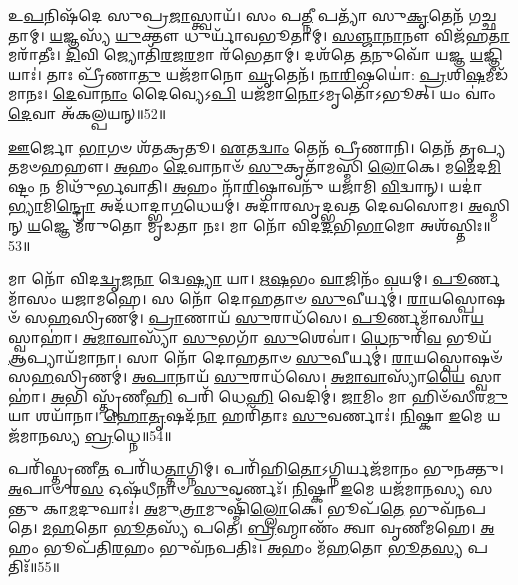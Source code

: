 𑌉\-\ul{𑌪}\-𑌨𑌿𑌷᳴𑌦𑍇 𑌸𑍁𑌪𑍍𑌰\-\ul{𑌜𑌾}\-𑌸𑍍𑌤𑍍𑌵𑌾𑌯᳴।
𑌸𑌂 𑌪\-\ul{𑌤𑍍𑌨𑍀} 𑌪𑌤𑍍𑌯𑌾᳴ 𑌸𑍁\-\ul{𑌕𑍃}\-𑌤𑍇𑌨᳴ 𑌗𑌚𑍍𑌛𑌤𑌾𑌮𑍍।
\-\ul{𑌯}\-𑌜𑍍𑌞𑌸𑍍𑌯᳴ \ul{𑌯𑍁}\-𑌕𑍍𑌤𑍗 𑌧𑍁𑌰𑍍𑌯𑌾᳴𑌵𑌭𑍂𑌤𑌾𑌮𑍍।
\-\ul{𑌸}\-\-\ul{𑌞𑍍𑌜𑌾}\-\-\ul{𑌨𑌾}\-𑌨𑍗 𑌵𑌿𑌜᳴𑌹\-\ul{𑌤𑌾}\-𑌮𑌰𑌾᳴𑌤𑍀𑌃।
\-\ul{𑌦𑌿}\-𑌵𑌿 𑌜𑍍𑌯𑍋𑌤𑌿᳴\-\ul{𑌰}\-𑌜\-\ul{𑌰}\-𑌮𑌾 𑌰᳴𑌭𑍇𑌤𑌾𑌮𑍍।
𑌦𑌶᳴𑌤𑍇 \ul{𑌤}\-𑌨𑍁𑌵𑍋᳴ 𑌯𑌜𑍍𑌞 \ul{𑌯}\-𑌜𑍍𑌞𑌿𑌯𑌾𑌃॑।
𑌤𑌾𑌃 𑌪𑍍𑌰𑍀᳴𑌣𑌾\-\ul{𑌤𑍁} 𑌯𑌜᳴𑌮𑌾𑌨𑍋 \ul{𑌘𑍃}\-𑌤𑍇𑌨᳴।
\-\ul{𑌨𑌾}\-\-\ul{𑌰𑌿}\-𑌷𑍍𑌠𑌯𑍋॑: \ul{𑌪𑍍𑌰}\-𑌶𑌿\-\ul{𑌷}\-𑌮𑍀𑌡᳴𑌮𑌾𑌨𑌃।
\-\ul{𑌦𑍇}\-𑌵𑌾\-\ul{𑌨𑌾𑌂} 𑌦𑍈𑌵𑍍𑌯𑍇𑌽\-\ul{𑌪𑌿} 𑌯𑌜᳴𑌮𑌾\-\ul{𑌨𑍋}\-\-𑌽𑌮𑍃𑌤𑍋᳴\-𑌽𑌭𑍂𑌤𑍍।
𑌯𑌂 𑌵𑌾𑌂॑ \ul{𑌦𑍇}\-𑌵𑌾 𑌅᳴𑌕𑌲𑍍𑌪𑌯𑌨𑍍॥52॥

\-\ul{𑌊}\-𑌰𑍍𑌜𑍋 \ul{𑌭𑌾}\-𑌗𑍞 𑌶᳴𑌤𑌕𑍍𑌰𑌤𑍂।
\-\ul{𑌏}\-𑌤\-\ul{𑌦𑍍𑌵𑌾𑌂} 𑌤𑍇𑌨᳴ 𑌪𑍍𑌰𑍀𑌣𑌾𑌨𑌿।
𑌤𑍇𑌨᳴ 𑌤𑍃𑌪𑍍𑌯𑌤𑌮𑍞𑌹𑌹𑍗।
\-\ul{𑌅}\-𑌹𑌂 \ul{𑌦𑍇}\-𑌵𑌾𑌨𑌾𑍞᳴ \ul{𑌸𑍁}\-𑌕𑍃𑌤𑌾᳴𑌮𑌸𑍍𑌮𑌿 \ul{𑌲𑍋}\-𑌕𑍇।
𑌮\-\ul{𑌮𑍇}\-𑌦\-\ul{𑌮𑌿}\-𑌷𑍍𑌟𑌂 𑌨 𑌮𑌿𑌥𑍁᳴𑌰𑍍𑌭𑌵𑌾𑌤𑌿।
\-\ul{𑌅}\-𑌹𑌂 𑌨𑌾᳴\-\ul{𑌰𑌿}\-𑌷𑍍𑌠𑌾𑌵𑌨𑍁᳴ 𑌯𑌜𑌾𑌮𑌿 \ul{𑌵𑌿}\-𑌦𑍍𑌵𑌾𑌨𑍍।
𑌯𑌦𑌾॑\-\ul{𑌭𑍍𑌯𑌾}\-𑌮𑌿\-\ul{𑌨𑍍𑌦𑍍𑌰𑍋} 𑌅𑌦᳴𑌧𑌾𑌦𑍍𑌭𑌾\-\ul{𑌗}\-𑌧𑍇𑌯𑌮𑍍॑।
𑌅𑌦𑌾᳴𑌰𑌸𑍃𑌦𑍍𑌭𑌵𑌤 𑌦𑍇𑌵𑌸𑍋𑌮।
\-\ul{𑌅}\-𑌸𑍍𑌮𑌿𑌨𑍍 \ul{𑌯}\-𑌜𑍍𑌞𑍇 𑌮᳴𑌰𑍁𑌤𑍋 𑌮𑍃𑌡𑌤𑌾 𑌨𑌃।
𑌮𑌾 𑌨𑍋᳴ 𑌵𑌿𑌦\-\ul{𑌦}\-𑌭𑌿\-\ul{𑌭𑌾}\-𑌮𑍋 𑌅𑌶᳴𑌸𑍍𑌤𑌿𑌃॥53॥

𑌮𑌾 𑌨𑍋᳴ 𑌵𑌿𑌦\-\ul{𑌦𑍍𑌵𑍃}\-𑌜\-\ul{𑌨𑌾} 𑌦𑍍𑌵𑍇\-\ul{𑌷𑍍𑌯𑌾} 𑌯𑌾।
\-\ul{𑌋}\-\-\ul{𑌷}\-𑌭𑌂 \ul{𑌵𑌾}\-𑌜𑌿𑌨𑌂᳴ \ul{𑌵}\-𑌯𑌮𑍍।
\-\ul{𑌪𑍂}\-𑌰𑍍𑌣𑌮𑌾᳴𑌸𑌂 𑌯𑌜𑌾𑌮𑌹𑍇।
𑌸 𑌨𑍋᳴ 𑌦𑍋𑌹𑌤𑌾𑍞 \ul{𑌸𑍁}\-𑌵𑍀𑌰𑍍𑌯𑌮𑍍॑।
\-\ul{𑌰𑌾}\-𑌯𑌸𑍍𑌪𑍋𑌷𑍞᳴ 𑌸\-\ul{𑌹}\-𑌸𑍍𑌰𑌿𑌣𑌮𑍍॑।
\-\ul{𑌪𑍍𑌰𑌾}\-𑌣𑌾𑌯᳴ \ul{𑌸𑍁}\-𑌰𑌾𑌧᳴𑌸𑍇।
\-\ul{𑌪𑍂}\-𑌰𑍍𑌣𑌮𑌾᳴𑌸𑌾\-\ul{𑌯} 𑌸𑍍𑌵𑌾𑌹𑌾॑।
\-\ul{𑌅}\-\-\ul{𑌮𑌾}\-\-\ul{𑌵𑌾}\-𑌸𑍍𑌯𑌾᳴ \ul{𑌸𑍁}\-𑌭𑌗𑌾᳴ \ul{𑌸𑍁}\-𑌶𑍇𑌵𑌾॑।
\-\ul{𑌧𑍇}\-𑌨𑍁𑌰𑌿᳴\-\ul{𑌵} 𑌭𑍂𑌯᳴ \ul{𑌆}\-𑌪𑍍𑌯𑌾𑌯᳴𑌮𑌾𑌨𑌾।
𑌸𑌾 𑌨𑍋᳴ 𑌦𑍋𑌹𑌤𑌾𑍞 \ul{𑌸𑍁}\-𑌵𑍀𑌰𑍍𑌯𑌮𑍍॑।
\-\ul{𑌰𑌾}\-𑌯𑌸𑍍𑌪𑍋𑌷𑍞᳴ 𑌸\-\ul{𑌹}\-𑌸𑍍𑌰𑌿𑌣𑌮𑍍॑।
\-\ul{𑌅}\-\-\ul{𑌪𑌾}\-𑌨𑌾𑌯᳴ \ul{𑌸𑍁}\-𑌰𑌾𑌧᳴𑌸𑍇।
\-\ul{𑌅}\-\-\ul{𑌮𑌾}\-\-\ul{𑌵𑌾}\-𑌸𑍍𑌯𑌾᳴\-\ul{𑌯𑍈} 𑌸𑍍𑌵𑌾𑌹𑌾॑।
\-\ul{𑌅}\-𑌭𑌿 𑌸𑍍𑌤𑍃᳴𑌣𑍀\-\ul{𑌹𑌿} 𑌪𑌰𑌿᳴ 𑌧𑍇\-\ul{𑌹𑌿} 𑌵𑍇𑌦𑌿𑌮𑍍॑।
\-\ul{𑌜𑌾}\-𑌮𑌿𑌂 𑌮𑌾 𑌹𑌿𑍞᳴𑌸𑍀𑌰\-\ul{𑌮𑍁}\-𑌯𑌾 𑌶𑌯𑌾᳴𑌨𑌾।
\-\ul{𑌹𑍋}\-\-\ul{𑌤𑍃}\-𑌷𑌦᳴\-\ul{𑌨𑌾} 𑌹𑌰𑌿᳴𑌤𑌾𑌃 \ul{𑌸𑍁}\-𑌵𑌰𑍍𑌣𑌾𑌃॑।
\-\ul{𑌨𑌿}\-𑌷𑍍𑌕𑌾 \ul{𑌇}\-𑌮𑍇 𑌯𑌜᳴𑌮𑌾𑌨𑌸𑍍𑌯 \ul{𑌬𑍍𑌰}\-𑌧𑍍𑌨𑍇॥54॥

𑌪𑌰𑌿᳴𑌸𑍍𑌤𑍃𑌣𑍀\-\ul{𑌤} 𑌪𑌰𑌿᳴𑌧\-\ul{𑌤𑍍𑌤𑌾}\-𑌗𑍍𑌨𑌿𑌮𑍍।
𑌪𑌰𑌿᳴𑌹𑌿\-\ul{𑌤𑍋}\-\-𑌽𑌗𑍍𑌨𑌿𑌰𑍍𑌯𑌜᳴𑌮𑌾𑌨𑌂 𑌭𑍁𑌨𑌕𑍍𑌤𑍁।
\-\ul{𑌅}\-𑌪𑌾𑍞 𑌰\-\ul{𑌸} 𑌓𑌷᳴𑌧𑍀𑌨𑌾𑍞 \ul{𑌸𑍁}\-𑌵𑌰𑍍𑌣𑌃᳴।
\-\ul{𑌨𑌿}\-𑌷𑍍𑌕𑌾 \ul{𑌇}\-𑌮𑍇 𑌯𑌜᳴𑌮𑌾𑌨𑌸𑍍𑌯 𑌸𑌨𑍍𑌤𑍁 𑌕𑌾\-\ul{𑌮}\-𑌦𑍁𑌘𑌾𑌃॑।
\-\ul{𑌅}\-𑌮𑍁\-\ul{𑌤𑍍𑌰𑌾}\-𑌮𑍁𑌷𑍍𑌮𑌿𑌁᳴\-\ul{𑌲𑍍𑌲𑍋}\-𑌕𑍇।
𑌭𑍂𑌪᳴\-\ul{𑌤𑍇} 𑌭𑍁𑌵᳴𑌨𑌪𑌤𑍇।
\-\ul{𑌮}\-\-\ul{𑌹}\-𑌤𑍋 \ul{𑌭𑍂}\-𑌤𑌸𑍍𑌯᳴ 𑌪𑌤𑍇।
\-\ul{𑌬𑍍𑌰}\-𑌹𑍍𑌮𑌾𑌣𑌂᳴ 𑌤𑍍𑌵𑌾 𑌵𑍃𑌣𑍀𑌮𑌹𑍇।
\-\ul{𑌅}\-𑌹𑌂 𑌭𑍂𑌪᳴𑌤𑌿\-\ul{𑌰}\-𑌹𑌂 𑌭𑍁𑌵᳴𑌨𑌪𑌤𑌿𑌃।
\-\ul{𑌅}\-𑌹𑌂 𑌮᳴\-\ul{𑌹}\-𑌤𑍋 \ul{𑌭𑍂}\-𑌤\-\ul{𑌸𑍍𑌯} 𑌪𑌤𑌿𑌃᳴॥55॥

